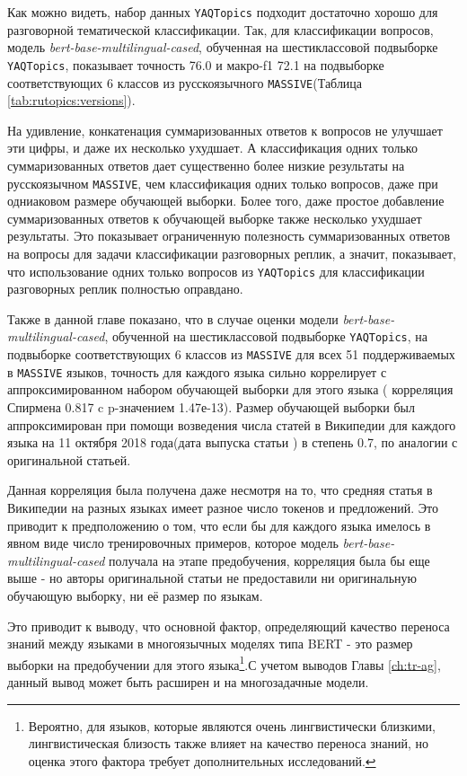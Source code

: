 Как можно видеть, набор данных \texttt{YAQTopics} подходит достаточно хорошо для разговорной тематической классификации. Так, для классификации вопросов, модель \textit{bert-base-multilingual-cased}, обученная на шестиклассовой подвыборке \texttt{YAQTopics}, показывает точность 76.0 и макро-f1 72.1 на подвыборке соответствующих 6 классов из русскоязычного \texttt{MASSIVE}(Таблица \ref{tab:rutopics:versions}). 

 На удивление, конкатенация суммаризованных ответов к вопросов не улучшает эти цифры, и даже их несколько ухудшает. А классификация одних только суммаризованных ответов дает существенно более низкие результаты на русскоязычном \texttt{MASSIVE}, чем классификация одних только вопросов, даже при одниаковом размере обучающей выборки. Более того, даже простое добавление суммаризованных ответов к обучающей выборке также несколько ухудшает результаты. Это показывает ограниченную полезность суммаризованных ответов на вопросы для задачи классификации разговорных реплик, а значит, показывает, что использование одних только вопросов  из \texttt{YAQTopics} для классификации разговорных реплик полностью оправдано. 

Также в данной главе показано, что в случае оценки модели  \textit{bert-base-multilingual-cased}, обученной на шестиклассовой подвыборке \texttt{YAQTopics}, на подвыборке соответствующих 6 классов из \texttt{MASSIVE} для всех 51 поддерживаемых в \texttt{MASSIVE} языков, точность для каждого языка сильно коррелирует с аппроксимированном набором обучающей выборки для этого языка ( корреляция Спирмена 0.817 c p-значением 1.47е-13). Размер обучающей выборки был аппроксимирован при помощи возведения числа статей в Википедии для каждого языка на 11 октября 2018 года(дата выпуска статьи \cite{bert}) в степень 0.7, по аналогии с оригинальной статьей. 

Данная корреляция была получена даже несмотря на то, что средняя статья в Википедии на разных языках имеет разное число токенов и предложений. Это приводит к предположению о том, что если бы для каждого языка имелось в явном виде число тренировочных примеров, которое модель \textit{bert-base-multilingual-cased} получала на этапе предобучения, корреляция была бы еще выше - но авторы оригинальной статьи не предоставили ни оригинальную обучающую выборку, ни её размер по языкам. 

Это приводит к выводу, что основной фактор, определяющий качество переноса знаний между языками в многоязычных моделях типа BERT - это размер выборки на предобучении для этого языка\footnote{Вероятно, для языков, которые являются очень лингвистически близкими, лингвистическая близость также влияет на качество переноса знаний, но оценка этого фактора требует дополнительных исследований.}.С учетом выводов Главы \ref{ch:tr-ag}, данный вывод может быть расширен и на многозадачные модели. 



